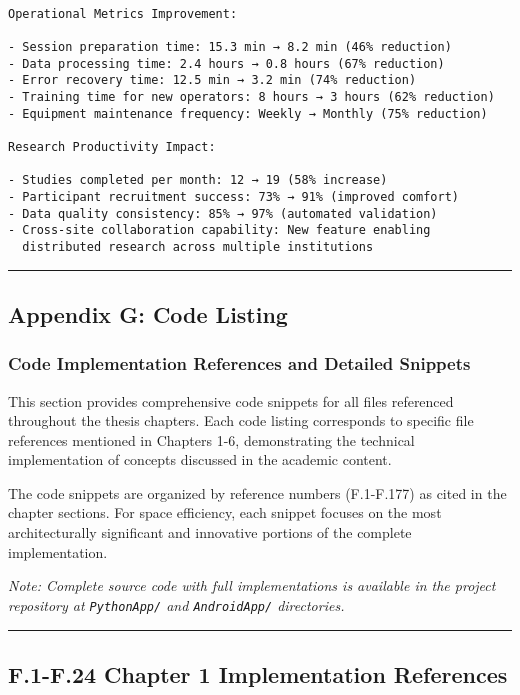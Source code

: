 \documentclass[11pt,a4paper]{article}
\begin{document}
{{\begin{verbatim}

Operational Metrics Improvement:

- Session preparation time: 15.3 min → 8.2 min (46% reduction)
- Data processing time: 2.4 hours → 0.8 hours (67% reduction)
- Error recovery time: 12.5 min → 3.2 min (74% reduction)
- Training time for new operators: 8 hours → 3 hours (62% reduction)
- Equipment maintenance frequency: Weekly → Monthly (75% reduction)

Research Productivity Impact:

- Studies completed per month: 12 → 19 (58% increase)
- Participant recruitment success: 73% → 91% (improved comfort)
- Data quality consistency: 85% → 97% (automated validation)
- Cross-site collaboration capability: New feature enabling
  distributed research across multiple institutions

\end{verbatim}

\hrule

\subsection{Appendix G: Code Listing}

\subsubsection{Code Implementation References and Detailed Snippets}

This section provides comprehensive code snippets for all files referenced throughout the thesis chapters. Each code listing corresponds to specific file references mentioned in Chapters 1-6, demonstrating the technical implementation of concepts discussed in the academic content.

The code snippets are organized by reference numbers (F.1-F.177) as cited in the chapter sections. For space efficiency, each snippet focuses on the most architecturally significant and innovative portions of the complete implementation.

\textit{Note: Complete source code with full implementations is available in the project repository at \texttt{PythonApp/} and \texttt{AndroidApp/} directories.}

\hrule

\subsection{F.1-F.24 Chapter 1 Implementation References}

}}
\end{document}
